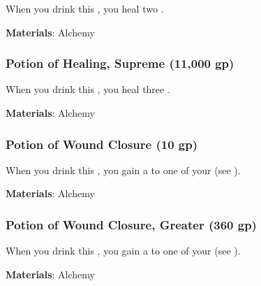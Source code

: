 When you drink this , you heal two .



\vspace{0.25em}
\textbf{Materials}: Alchemy


\lowercase{\hypertarget{item:Potion of Healing, Supreme}{}}\label{item:Potion of Healing, Supreme}
\hypertarget{item:Potion of Healing, Supreme}{\subsubsection{Potion of Healing, Supreme\hfill{} (11,000  gp)}}

When you drink this , you heal three .



\vspace{0.25em}
\textbf{Materials}: Alchemy


\lowercase{\hypertarget{item:Potion of Wound Closure}{}}\label{item:Potion of Wound Closure}
\hypertarget{item:Potion of Wound Closure}{\subsubsection{Potion of Wound Closure\hfill{} (10 gp)}}

When you drink this , you gain a   to one of your  (see ).



\vspace{0.25em}
\textbf{Materials}: Alchemy


\lowercase{\hypertarget{item:Potion of Wound Closure, Greater}{}}\label{item:Potion of Wound Closure, Greater}
\hypertarget{item:Potion of Wound Closure, Greater}{\subsubsection{Potion of Wound Closure, Greater\hfill{} (360 gp)}}

When you drink this , you gain a   to one of your  (see ).



\vspace{0.25em}
\textbf{Materials}: Alchemy



